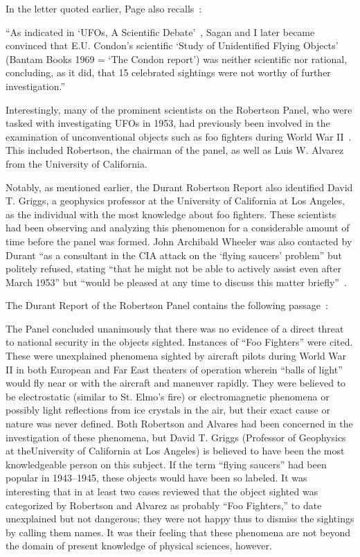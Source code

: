 In the letter quoted earlier, Page also recalls~\cite{Page1992}:
\begin{svgraybox}
``As indicated in `UFOs, A Scientific Debate'~\cite{Sagan1974Jan}, Sagan and I later became convinced that E.U. Condon's scientific `Study of Unidentified Flying Objects'~\cite{Condon-report}
(Bantam Books 1969 = `The Condon report')
was neither scientific nor rational, concluding, as it did, that 15 celebrated sightings were not worthy of further investigation.''
\end{svgraybox}

Interestingly, many of the prominent scientists on the Robertson Panel,
who were tasked with investigating UFOs in 1953, had previously been involved in the examination of unconventional
objects such as foo fighters during World War II~\cite{Chester2007May,Rendall2021Aug}. This included Robertson,
the chairman of the panel,
as well as Luis W. Alvarez from the University of California.

Notably, as mentioned earlier, the Durant Robertson Report also identified David T. Griggs, a geophysics professor at the University of California at Los Angeles,
as the individual with the most knowledge about foo fighters. These scientists had been observing and
analyzing this phenomenon for a considerable amount of time before the panel was formed.
John Archibald Wheeler was also contacted by Durant ``as a consultant in the CIA attack on the `flying saucers' problem'' but politely refused,
stating ``that he might not be able to actively assist even after March 1953''
but ``would be pleased at any time to discuss this matter briefly''~\cite{WheelerFOIACIA0005515945}.

The Durant Report of the Robertson Panel contains the following passage~\cite{RobertsonPanelDurantReport}:
\begin{svgraybox}
The Panel concluded unanimously that there was no evidence of a direct threat to national security in the objects sighted.
Instances of ``Foo Fighters'' were cited.
These were unexplained phenomena sighted by aircraft pilots during World War II in both European and Far East theaters
of operation wherein ``balls of light'' would fly near or with the aircraft and maneuver rapidly.
They were believed to be electrostatic (similar to St. Elmo's fire) or
electromagnetic phenomena or possibly light reflections from ice crystals in the air,
but their exact cause or nature was never defined.
Both Robertson and Alvares had been concerned in the investigation of these phenomena,
but David T. Griggs (Professor of Geophysics at theUniversity of California at Los Angeles)
is believed to have been the most knowledgeable person on this subject.
If the term ``flying saucers'' had been popular in 1943--1945, these objects would
have been so labeled.
It was interesting that in at least two cases reviewed that the object sighted was categorized by Robertson and Alvarez as probably
``Foo Fighters,'' to date unexplained but not dangerous; they were not happy thus to dismiss the sightings by calling them names.
It was their feeling that these phenomena are not beyond the domain of present knowledge of physical sciences, however.
\end{svgraybox}

